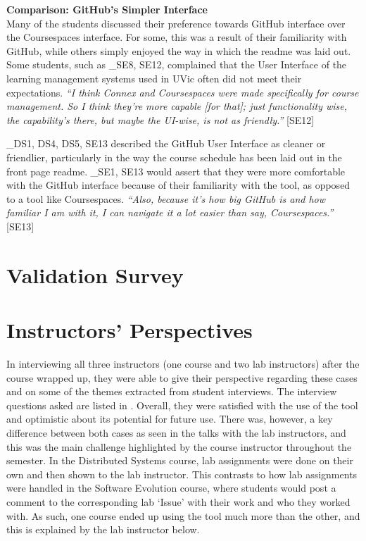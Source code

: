 \textbf{Comparison: GitHub's Simpler Interface} \\
Many of the students discussed their preference towards GitHub interface over the Coursespaces interface. For some, this was a result of their familiarity with GitHub, while others simply enjoyed the way in which the readme was laid out. Some students, such as _{SE8, SE12}, complained that the User Interface of the learning management systems used in UVic often did not meet their expectations. \textit{``I think Connex and Coursespaces were made specifically for course management. So I think they're more capable [for that]; just functionality wise, the capability's there, but maybe the UI-wise, is not as friendly.''} [SE12]

_{DS1, DS4, DS5, SE13} described the GitHub User Interface as cleaner or friendlier, particularly in the way the course schedule has been laid out in the front page readme. _{SE1, SE13} would assert that they were more comfortable with the GitHub interface because of their familiarity with the tool, as opposed to a tool like Coursespaces. \textit{``Also, because it's how big GitHub is and how familiar I am with it, I can navigate it a lot easier than say, Coursespaces.''} [SE13]


\section{Validation Survey}

\section{Instructors' Perspectives}
In interviewing all three instructors (one course and two lab instructors) after the course wrapped up, they were able to give their perspective regarding these cases and on some of the themes extracted from student interviews. The interview questions asked are listed in . Overall, they were satisfied with the use of the tool and optimistic about its potential for future use. There was, however, a key difference between both cases as seen in the talks with the lab instructors, and this was the main challenge highlighted by the course instructor throughout the semester. In the Distributed Systems course, lab assignments were done on their own and then shown to the lab instructor. This contrasts to how lab assignments were handled in the Software Evolution course, where students would post a comment to the corresponding lab `Issue' with their work and who they worked with. As such, one course ended up using the tool much more than the other, and this is explained by the lab instructor below.


